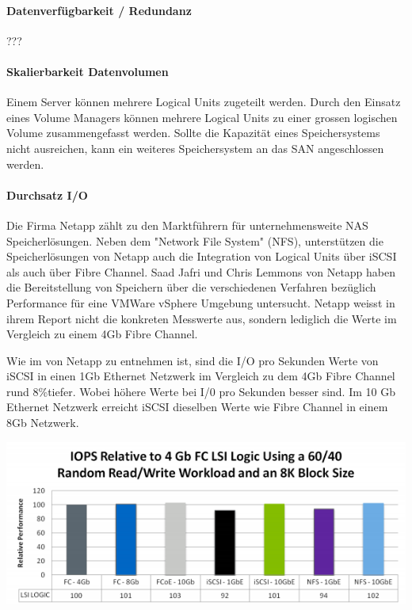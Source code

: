 \paragraph*{Datenverfügbarkeit / Redundanz}
???

\paragraph*{Skalierbarkeit Datenvolumen}
Einem Server können mehrere Logical Units zugeteilt werden. Durch den Einsatz eines Volume Managers können mehrere Logical Units zu einer grossen logischen Volume zusammengefasst werden. Sollte die Kapazität eines Speichersystems nicht ausreichen, kann ein weiteres Speichersystem an das SAN angeschlossen werden.

\paragraph*{Durchsatz I/O}
Die Firma Netapp zählt zu den Marktführern für unternehmensweite NAS Speicherlösungen. Neben dem "Network File System" (NFS), unterstützen die Speicherlösungen von Netapp auch die Integration von Logical Units über iSCSI als auch über Fibre Channel. Saad Jafri und Chris Lemmons von Netapp haben die Bereitstellung von Speichern über die verschiedenen Verfahren bezüglich Performance für eine VMWare vSphere Umgebung untersucht. Netapp weisst in ihrem Report nicht die konkreten Messwerte aus, sondern lediglich die Werte im Vergleich zu einem 4Gb Fibre Channel.

Wie im  von Netapp zu entnehmen ist, sind die I/O pro Sekunden Werte von iSCSI in einen 1Gb Ethernet Netzwerk im Vergleich zu dem 4Gb Fibre Channel rund 8\%tiefer. Wobei höhere Werte bei I/0 pro Sekunden besser sind. Im 10 Gb Ethernet Netzwerk erreicht iSCSI dieselben Werte wie Fibre Channel in einem 8Gb Netzwerk.\cite{Jafri2011}

\begin{center}
\includegraphics[width=\linewidth, keepaspectratio = true]{media/netapp_iops.png}
\end{center}

